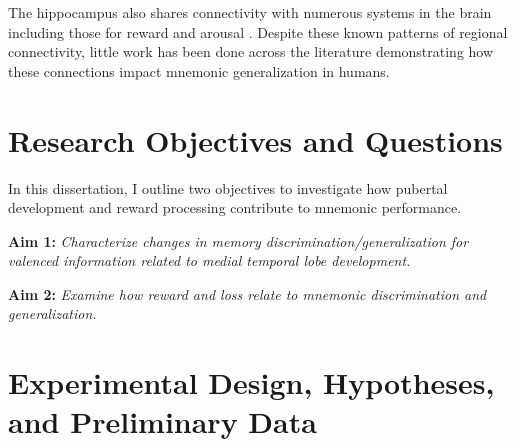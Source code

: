 \documentclass[11pt]{article}
\providecommand\citep{\cite}
\begin{document}
The hippocampus also shares connectivity with numerous systems in the brain including
those for reward \citep{lisman_neohebbian_2011,kempadoo_dopamine_2016} and arousal
\citep{yang_bla_2016,yang_bla_2017}. Despite these known patterns of regional
connectivity, little work has been done across the literature demonstrating how these
connections impact mnemonic generalization in humans. 

\section*{Research Objectives and Questions}
In this dissertation, I outline two objectives to investigate how pubertal
development and reward processing contribute to
mnemonic performance.\par
\textbf{Aim 1: }\textit{Characterize changes in memory discrimination/generalization for
    valenced information related to medial temporal lobe development.} \par
\textbf{Aim 2: }\textit{Examine how reward and loss relate to mnemonic
    discrimination and generalization.} \par

\section*{Experimental Design, Hypotheses, and Preliminary Data}
\end{document}
